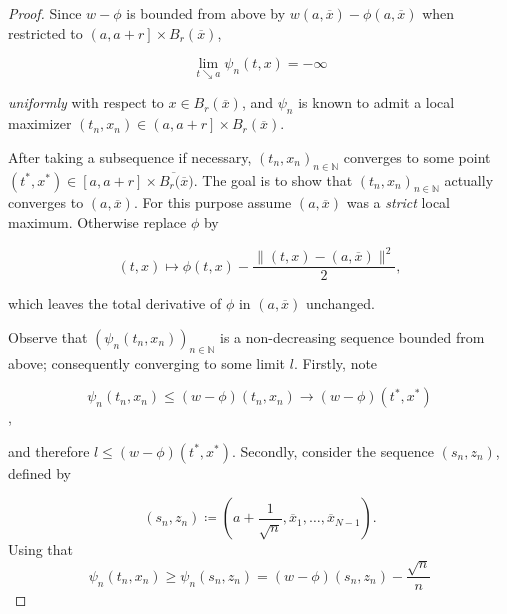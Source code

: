 \begin{lemma}
\begin{proof}
				Since $ w - \phi $ is bounded from above by $ w(a, \overline{x}) - \phi(a, \overline{x}) $ when restricted to $ \left( a, a + r \right] \times B_r(\overline{x}) $,
				
				\begin{equation*}
					\lim\limits_{t \searrow a} \psi_n(t, x) = - \infty
				\end{equation*}
				
				\emph{uniformly} with respect to $ x \in B_r(\overline{x}) $, and $ \psi_n $ is known to admit a local maximizer $ (t_n, x_n) \in \left( a, a + r \right] \times B_r(\overline{x}) $.
				
				After taking a subsequence if necessary, $ (t_n, x_n)_{n \in \mathbb{N}} $ converges to some point $ (t^{*}, x^{*}) \in \left[a, a +r \right] \times \overline{B_r(\overline{x}}) $. The goal is to show that $ (t_n, x_n)_{n \in \mathbb{N}} $ actually converges to $ (a, \overline{x}) $. For this purpose assume $ (a, \overline{x}) $ was a \emph{strict} local maximum. Otherwise replace $ \phi $ by
				
				\begin{equation*}
					(t, x) \mapsto \phi(t, x) - \frac{\lVert (t, x) - (a, \overline{x}) \rVert^2}{2},
				\end{equation*}
				
				which leaves the total derivative of $ \phi $ in $ (a, \overline{x}) $ unchanged. 
				
				Observe that $ (\psi_n(t_n, x_n))_{n \in \mathbb{N}} $ is a non-decreasing sequence bounded from above; consequently converging to some limit $ l $. Firstly, note 
				
				\begin{equation*}
					\psi_n(t_n, x_n) \leq (w- \phi)(t_n, x_n) \to (w-\phi)(t^{*}, x^{*})
				\end{equation*}, 
				
				and therefore $ l \leq (w-\phi)(t^{*}, x^{*}) $. Secondly, consider the sequence $ (s_n, z_n) $, defined by
				
				\begin{equation*}
					(s_n, z_n) \coloneqq  \left( a + \frac{1}{\sqrt{n}}, \overline{x}_1, \ldots, \overline{x}_{N-1} \right) .
				\end{equation*}
				Using that
				\begin{equation*}
					\psi_n(t_n, x_n) \geq \psi_n(s_n, z_n) = (w - \phi)(s_n, z_n) -\frac{\sqrt{n}}{n}
				\end{equation*}
				

\end{proof}
\end{lemma}
